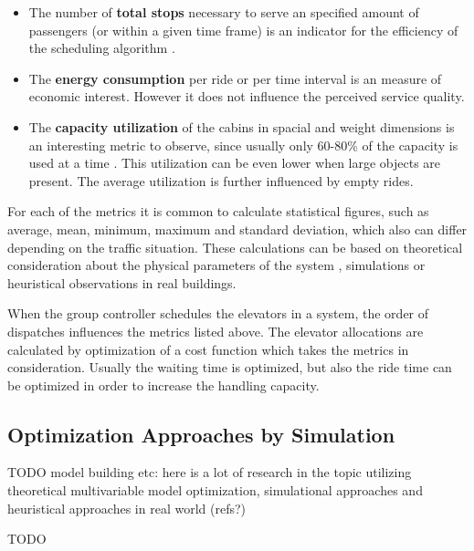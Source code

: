 \begin{itemize}
    \item The number of \textbf{total stops}
        necessary to serve an specified amount of passengers (or within a given time frame) is an indicator for the efficiency of the scheduling algorithm
        \autocite[][p.~194]{unger2015aufzuege}.
    
    \item The \textbf{energy consumption} 
        per ride or per time interval is an measure of economic interest. 
        However it does not influence the perceived service quality.
    
    \item The \textbf{capacity utilization} 
        of the cabins in spacial and weight dimensions is an interesting metric to observe, 
        since usually only 60-80\% of the capacity is used at a time 
        \autocite[][p.~194]{unger2015aufzuege}
        \autocite[][p.~7]{hakonen2003simulation}.
        This utilization can be even lower when large objects are present.
        The average utilization is further influenced by empty rides.
        
\end{itemize}

For each of the metrics it is common to calculate statistical figures, such as average, mean, minimum, maximum and standard deviation, which also can differ depending on the traffic situation.
These calculations can be based on theoretical consideration about the physical parameters of the system \autocite[][p.~194]{unger2015aufzuege}, simulations or heuristical observations in real buildings.
 
When the group controller schedules the elevators in a system, the order of dispatches influences the metrics listed above.
The elevator allocations are calculated by optimization of a cost function which takes the metrics in consideration.
Usually the waiting time is optimized, but also the ride time can be optimized in order to increase the handling capacity. \autocite[][p.~10]{siikonen1997models} 

\subsection{Optimization Approaches by Simulation}
TODO
model building etc: here is a lot of research in the topic utilizing theoretical multivariable model optimization, simulational approaches and heuristical approaches in real world (refs?)

\autocite[][pp.~7--11]{beers2015arrivals}
\autocite[][p.~193]{unger2015aufzuege}
\autocite[][]{peters2018elevate}


TODO
